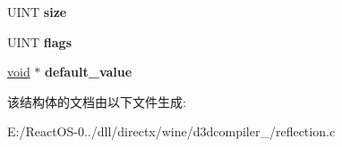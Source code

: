 \begin{DoxyCompactItemize}
U\+I\+NT {\bfseries size}
\item 
\mbox{\label{structd3dcompiler__shader__reflection__variable_a1515f86d1fd1c472e6c607edd2f16991}} 
U\+I\+NT {\bfseries flags}
\item 
\mbox{\label{structd3dcompiler__shader__reflection__variable_a89bd3b3c59937a59676e125da77a613e}} 
\hyperlink{interfacevoid}{void} $\ast$ {\bfseries default\+\_\+value}
\end{DoxyCompactItemize}


该结构体的文档由以下文件生成\+:\begin{DoxyCompactItemize}
\item 
E\+:/\+React\+O\+S-\/0../dll/directx/wine/d3dcompiler\+\_/reflection.\+c\end{DoxyCompactItemize}
